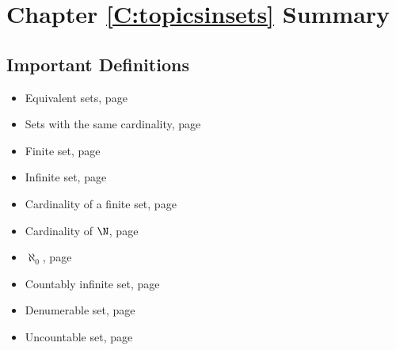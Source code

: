 \newpage
\section{Chapter \ref{C:topicsinsets} Summary}

\subsection*{Important Definitions}
\begin{multicols}{2}
\begin{itemize}
\item Equivalent sets, page~\pageref*{equivsets}
\item Sets with the same cardinality, page~\pageref*{equivsets}
\item Finite set, page~\pageref*{cardinalityfinite}
\item Infinite set, page~\pageref*{cardinalityfinite}
\item Cardinality of a finite set, page~\pageref*{cardinalityfinite}
\item Cardinality of $\N$, page~\pageref*{aleph0}
\item $\aleph_0$, page~\pageref*{aleph0}
\item Countably infinite set, page~\pageref*{countinfinite}
\item Denumerable set, page~\pageref*{countinfinite}
\item Uncountable set, page~\pageref*{countinfinite}
\end{itemize}
\end{multicols}
\hbreak



